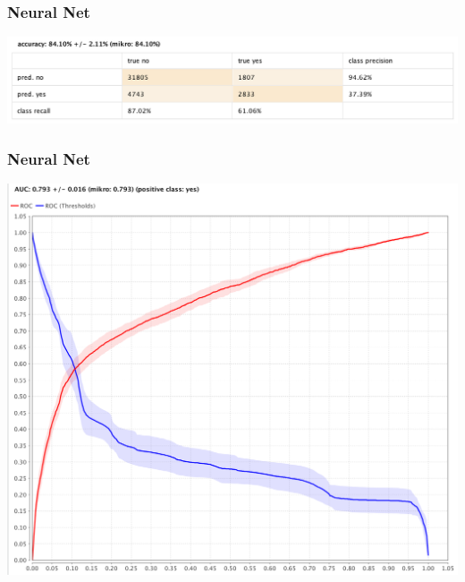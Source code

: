 \documentclass{beamer}
\begin{document}
\begin{frame}
	\frametitle{Neural Net}
  \includegraphics[width=\textwidth,height=\textheight,keepaspectratio]{nn}
\end{frame}

\begin{frame}
	\frametitle{Neural Net}
  \includegraphics[width=\textwidth,height=\textheight,keepaspectratio]{nn-roc}
\end{frame}
\end{document}
